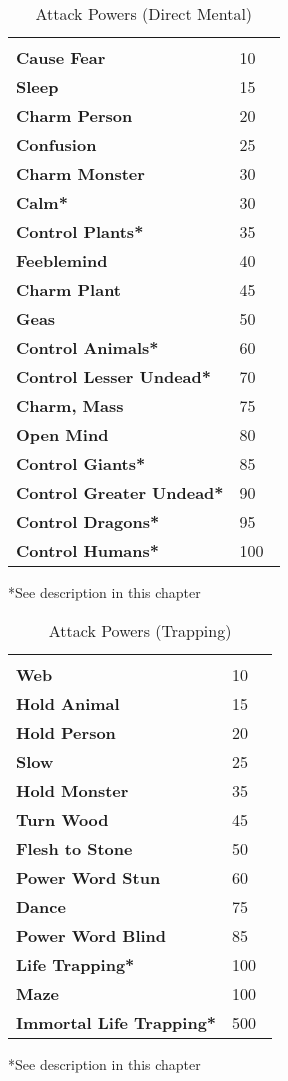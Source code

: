 \begin{multicols*}{2}
\begin {table}[H]
  \caption{Attack Powers (Direct Mental)}
  \begin{tabularx}{\columnwidth}{>{\bfseries}YY}
	 & \\
	Cause Fear & 10\\
	Sleep & 15\\
	Charm Person & 20\\
	Confusion & 25\\
	Charm Monster & 30\\
	Calm* & 30\\
	Control Plants* & 35\\
	Feeblemind & 40\\
	Charm Plant & 45\\
	Geas & 50\\
	Control Animals* & 60\\
	Control Lesser Undead* & 70\\
	Charm, Mass & 75\\
	Open Mind & 80\\
	Control Giants* & 85\\
	Control Greater Undead* & 90\\
	Control Dragons* & 95\\
	Control Humans* & 100\
  \end {tabularx}
	*See description in this chapter
\end {table}

\begin {table}[H]
	\caption{Attack Powers (Trapping)}
  \begin{tabularx}{\columnwidth}{>{\bfseries}YY}
   & \\
	Web & 10\\
	Hold Animal & 15\\
	Hold Person & 20\\
	Slow & 25\\
	Hold Monster & 35\\
	Turn Wood & 45\\
	Flesh to Stone & 50\\
	Power Word Stun & 60\\
	Dance & 75\\
	Power Word Blind & 85\\
	Life Trapping* & 100\\
	Maze & 100\\
	Immortal Life Trapping* & 500\
  \end {tabularx}
	*See description in this chapter
\end {table}


\end{multicols*}
